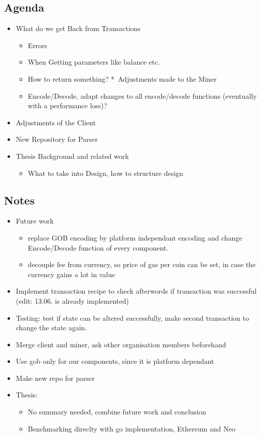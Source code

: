 \subsection{Agenda}
\begin{itemize}
\item
  What do we get Back from Transactions
  \begin{itemize}
  \item
    Errors
  \item
    When Getting parameters like balance etc.
  \item
    How to return something? *~Adjustments made to the Miner
  \item
    Encode/Decode, adapt changes to all encode/decode functions
    (eventually with a performance loss)?
  \end{itemize}
\item
  Adjustments of the Client
\item
  New Repository for Parser
\item
  Thesis Background and related work

  \begin{itemize}
  \item
    What to take into Design, how to structure design
  \end{itemize}
\end{itemize}

\subsection{Notes}
\begin{itemize}
\item
  Future work

  \begin{itemize}
  \item
    replace GOB encoding by platform independant encoding and change
    Encode/Decode function of every component.
  \item
    decouple fee from currency, so price of gas per coin can be set, in
    case the currency gains a lot in value
  \end{itemize}
\item
  Implement transaction recipe to check afterwords if transaction was
  successful (edit: 13.06. is already implemented)
\item
  Testing: test if state can be altered successfully, make second
  transaction to change the state again.
\item
  Merge client and miner, ask other organisation members beforehand
\item
  Use gob only for our components, since it is platform dependant
\item
  Make new repo for parser
\item
  Thesis:

  \begin{itemize}
  \item
    No summary needed, combine future work and conclusion
  \item
    Benchmarking direclty with go implementation, Ethereum and Neo
  \end{itemize}
\end{itemize}

